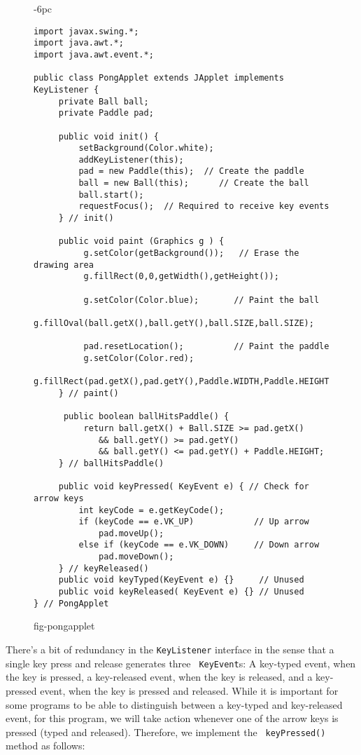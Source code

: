 \begin{figure}[p]
\jjjprogstart
\begin{jjjlistingleft}[32pc]{-6pc}
\begin{lstlisting}
import javax.swing.*;
import java.awt.*;
import java.awt.event.*;

public class PongApplet extends JApplet implements KeyListener {
     private Ball ball;
     private Paddle pad;

     public void init() {
         setBackground(Color.white);
         addKeyListener(this);
         pad = new Paddle(this);  // Create the paddle
         ball = new Ball(this);      // Create the ball
         ball.start();
         requestFocus();  // Required to receive key events
     } // init()

     public void paint (Graphics g ) {
          g.setColor(getBackground());   // Erase the drawing area
          g.fillRect(0,0,getWidth(),getHeight());

          g.setColor(Color.blue);       // Paint the ball
          g.fillOval(ball.getX(),ball.getY(),ball.SIZE,ball.SIZE);

          pad.resetLocation();          // Paint the paddle
          g.setColor(Color.red);
          g.fillRect(pad.getX(),pad.getY(),Paddle.WIDTH,Paddle.HEIGHT);
     } // paint()

      public boolean ballHitsPaddle() {
          return ball.getX() + Ball.SIZE >= pad.getX()
             && ball.getY() >= pad.getY()
             && ball.getY() <= pad.getY() + Paddle.HEIGHT;
     } // ballHitsPaddle()

     public void keyPressed( KeyEvent e) { // Check for arrow keys
         int keyCode = e.getKeyCode();
         if (keyCode == e.VK_UP)            // Up arrow
             pad.moveUp();
         else if (keyCode == e.VK_DOWN)     // Down arrow
             pad.moveDown();
     } // keyReleased()
     public void keyTyped(KeyEvent e) {}     // Unused
     public void keyReleased( KeyEvent e) {} // Unused
} // PongApplet
\end{lstlisting}
\end{jjjlistingleft}
{fig-pongapplet}
\end{figure}

There's a bit of redundancy in the {\tt KeyListener} interface in the
sense that a single key press and release generates three {\tt
KeyEvent}s: A key-typed event, when the key is pressed, a key-released
event, when the key is released, and a key-pressed event, when the key
is pressed and released.  While it is important for some programs to
be able to distinguish between a key-typed and key-released event, for
this program, we will take action whenever one of the arrow keys is
pressed (typed and released). Therefore, we implement the {\tt
keyPressed()} method as follows:

